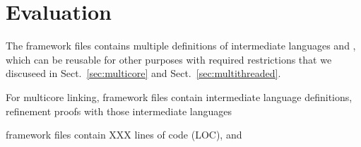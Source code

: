 \section{Evaluation}
\label{sec:evaluation}


The framework files contains multiple definitions of intermediate languages and , which can be reusable for other purposes with required restrictions that we discuseed in Sect.~\ref{sec:multicore} and Sect.~\ref{sec:multithreaded}. 

For multicore linking, framework files contain 
intermediate language definitions, 
refinement proofs with those intermediate languages 

framework files contain XXX lines of code (LOC), and 